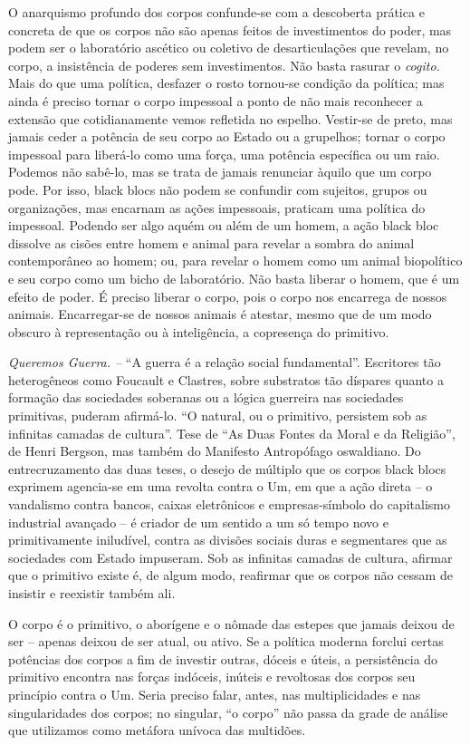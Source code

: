 O anarquismo profundo dos corpos confunde-se com a descoberta prática e
concreta de que os corpos não são apenas feitos de investimentos do
poder, mas podem ser o laboratório ascético ou coletivo de
desarticulações que revelam, no corpo, a insistência de poderes sem
investimentos. Não basta rasurar o \emph{cogito. }Mais do que uma
política, desfazer o rosto tornou-se condição da política; mas ainda é
preciso tornar o corpo impessoal a ponto de não mais reconhecer a
extensão que cotidianamente vemos refletida no espelho. Vestir-se de
preto, mas jamais ceder a potência de seu corpo ao Estado ou a
grupelhos; tornar o corpo impessoal para liberá-lo como uma força, uma
potência específica ou um raio. Podemos não sabê-lo, mas se trata de
jamais renunciar àquilo que um corpo pode. Por isso, black blocs não
podem se confundir com sujeitos, grupos ou organizações, mas encarnam as
ações impessoais, praticam uma política do impessoal. Podendo ser algo
aquém ou além de um homem, a ação black bloc dissolve as cisões entre
homem e animal para revelar a sombra do animal contemporâneo ao homem;
ou, para revelar o homem como um animal biopolítico e seu corpo como um
bicho de laboratório. Não basta liberar o homem, que é um efeito de
poder. É preciso liberar o corpo, pois o corpo nos encarrega de nossos
animais. Encarregar-se de nossos animais é atestar, mesmo que de um modo
obscuro à representação ou à inteligência, a copresença do primitivo.

\emph{Queremos Guerra. -- }``A guerra é a relação social fundamental''.
Escritores tão heterogêneos como Foucault e Clastres, sobre substratos
tão díspares quanto a formação das sociedades soberanas ou a lógica
guerreira nas sociedades primitivas, puderam afirmá-lo. ``O natural, ou
o primitivo, persistem sob as infinitas camadas de cultura''. Tese de
``As Duas Fontes da Moral e da Religião'', de Henri Bergson, mas também
do Manifesto Antropófago oswaldiano. Do entrecruzamento das duas teses,
o desejo de múltiplo que os corpos black blocs exprimem agencia-se em
uma revolta contra o Um, em que a ação direta -- o vandalismo contra
bancos, caixas eletrônicos e empresas-símbolo do capitalismo industrial
avançado -- é criador de um sentido a um só tempo novo e primitivamente
iniludível, contra as divisões sociais duras e segmentares que as
sociedades com Estado impuseram. Sob as infinitas camadas de cultura,
afirmar que o primitivo existe é, de algum modo, reafirmar que os corpos
não cessam de insistir e reexistir também ali.

O corpo é o primitivo, o aborígene e o nômade das estepes que jamais
deixou de ser -- apenas deixou de ser atual, ou ativo. Se a política
moderna forclui certas potências dos corpos a fim de investir outras,
dóceis e úteis, a persistência do primitivo encontra nas forças
indóceis, inúteis e revoltosas dos corpos seu princípio contra o Um.
Seria preciso falar, antes, nas multiplicidades e nas singularidades dos
corpos; no singular, ``o corpo'' não passa da grade de análise que
utilizamos como metáfora unívoca das multidões.

